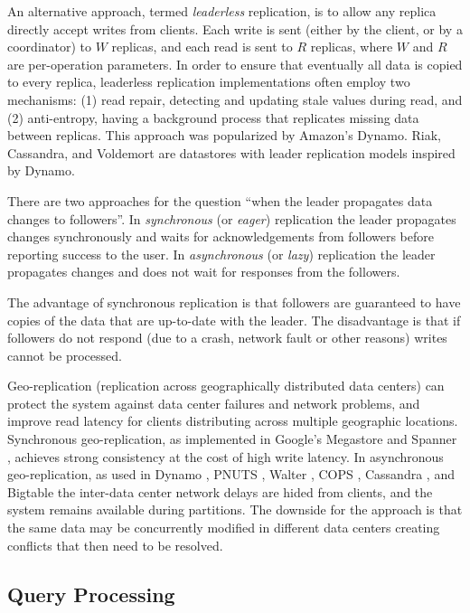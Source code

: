 An alternative approach, termed \textit{leaderless} replication, is to allow any replica directly accept writes from clients.
Each write is sent (either by the client, or by a coordinator) to $W$ replicas, and each read is sent to $R$ replicas,
where $W$ and $R$ are per-operation parameters.
In order to ensure that eventually all data is copied to every replica, leaderless replication implementations often employ two mechanisms:
(1) read repair, detecting and updating stale values during read, and (2) anti-entropy, having a background process that replicates missing data between replicas.
This approach was popularized by Amazon's Dynamo.
Riak, Cassandra, and Voldemort are datastores with leader replication models inspired by Dynamo.

\bigskip
\noindent
There are two approaches for the question ``when the leader propagates data changes to followers''.
In \textit{synchronous} (or \textit{eager}) replication the leader propagates changes synchronously and waits for acknowledgements from followers before reporting
success to the user.
In \textit{asynchronous} (or \textit{lazy}) replication the leader propagates changes and does not wait for responses from the followers.

The advantage of synchronous replication is that followers are guaranteed to have copies of the data that are up-to-date with the leader.
The disadvantage is that if followers do not respond (due to a crash, network fault or other reasons) writes cannot be processed.

\bigskip
\noindent
Geo-replication (replication across geographically distributed data centers) can protect the system against data center failures and network problems,
and improve read latency for clients distributing across multiple geographic locations.
Synchronous geo-replication, as implemented in Google's Megastore \cite{baker:megastore} and Spanner \cite{corbett:spanner, bacon:spanner},
achieves strong consistency at the cost of high write latency.
In asynchronous geo-replication, as used in Dynamo \cite{deCandia:dynamo}, PNUTS \cite{cooper:pnuts08, cooper:pnuts19},
Walter \cite{sovran:walter}, COPS \cite{lloyd:cops}, Cassandra \cite{lakshman:cassandra}, and Bigtable \cite{chang:bigtable}
the inter-data center network delays are hided from clients, and the system remains available during partitions.
The downside for the approach is that the same data may be concurrently modified in different data centers creating
conflicts that then need to be resolved.


\subsection{Query Processing}
